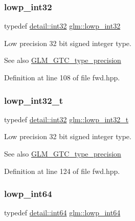 \subsubsection{\texorpdfstring{lowp\_int32}{lowp\_int32}}
{\footnotesize\ttfamily typedef \mbox{\hyperlink{namespaceglm_1_1detail_a9f85b4efeca416cdcec2fd08939a2e17}{detail\+::int32}} \mbox{\hyperlink{group__gtc__type__precision_gad9939c9d6fec1c6accc02a83c6500f08}{glm\+::lowp\+\_\+int32}}}

Low precision 32 bit signed integer type. \begin{DoxySeeAlso}{See also}
\mbox{\hyperlink{group__gtc__type__precision}{G\+L\+M\+\_\+\+G\+T\+C\+\_\+type\+\_\+precision}} 
\end{DoxySeeAlso}


Definition at line 108 of file fwd.\+hpp.

\mbox{\label{group__gtc__type__precision_gad9567c806dc39f534174eef42663119d}} 
\subsubsection{\texorpdfstring{lowp\_int32\_t}{lowp\_int32\_t}}
{\footnotesize\ttfamily typedef \mbox{\hyperlink{namespaceglm_1_1detail_a9f85b4efeca416cdcec2fd08939a2e17}{detail\+::int32}} \mbox{\hyperlink{group__gtc__type__precision_gad9567c806dc39f534174eef42663119d}{glm\+::lowp\+\_\+int32\+\_\+t}}}

Low precision 32 bit signed integer type. \begin{DoxySeeAlso}{See also}
\mbox{\hyperlink{group__gtc__type__precision}{G\+L\+M\+\_\+\+G\+T\+C\+\_\+type\+\_\+precision}} 
\end{DoxySeeAlso}


Definition at line 124 of file fwd.\+hpp.

\mbox{\label{group__gtc__type__precision_gab8a8e75af347592406e41b3ae2c0712b}} 
\subsubsection{\texorpdfstring{lowp\_int64}{lowp\_int64}}
{\footnotesize\ttfamily typedef \mbox{\hyperlink{namespaceglm_1_1detail_a5b1c3227ec636c24a0676746381adfc8}{detail\+::int64}} \mbox{\hyperlink{group__gtc__type__precision_gab8a8e75af347592406e41b3ae2c0712b}{glm\+::lowp\+\_\+int64}}}


